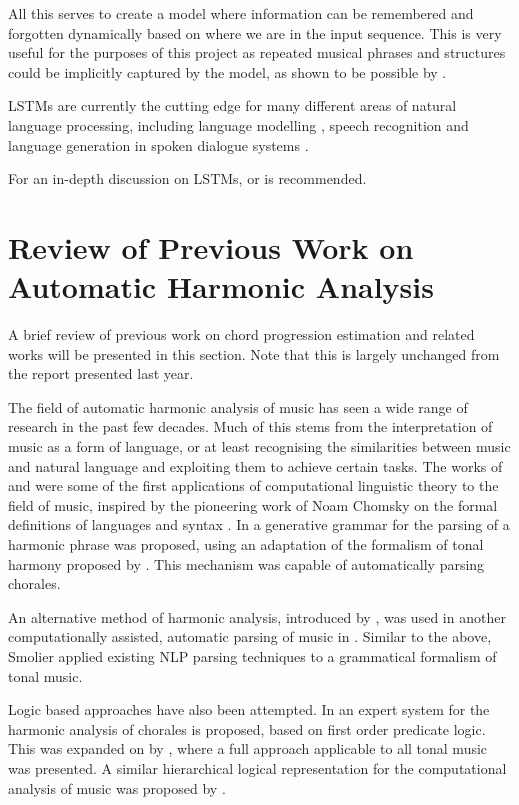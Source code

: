 \documentclass[bsc,singlespacing,logo, parskip, deptreport]{infthesis}
\begin{document}
All this serves to create a model where information can be remembered and forgotten dynamically based on where we are in the input sequence. This is very useful for the purposes of this project as repeated musical phrases and structures could be implicitly captured by the model, as shown to be possible by \cite{eck2008learning}.

LSTMs are currently the cutting edge for many different areas of natural language processing, including language modelling \cite{sundermeyer2012lstm} \cite{pichotta2016using}, speech recognition \cite{han2017ese} and language generation in spoken dialogue systems \cite{wen2016multi}.

For an in-depth discussion on LSTMs, \cite{olah_2015} or \cite{greff2016lstm} is recommended.

\section{Review of Previous Work on Automatic Harmonic Analysis}

A brief review of previous work on chord progression estimation and related works will be presented in this section. Note that this is largely unchanged from the report presented last year.

The field of automatic harmonic analysis of music has seen a wide range of research in the past few decades. Much of this stems from the interpretation of music as a form of language, or at least recognising the similarities between music and natural language and exploiting them to achieve certain tasks. The works of \cite{winograd1968linguistics} and \cite{forte1967syntax} were some of the first applications of computational linguistic theory to the field of music, inspired by the pioneering work of Noam Chomsky on the formal definitions of languages and syntax \cite{lees1957syntactic}. In \cite{winograd1968linguistics} a generative grammar for the parsing of a harmonic phrase was proposed, using an adaptation of the formalism of tonal harmony proposed by \cite{forte1962tonal}. This mechanism was capable of automatically parsing chorales.

An alternative method of harmonic analysis, introduced by \cite{schenker1979harmony}, was used in another computationally assisted, automatic parsing of music in \cite{smoliar1979computer}. Similar to the above, Smolier applied existing NLP parsing techniques to a grammatical formalism of tonal music.

Logic based approaches have also been attempted. In \cite{ebciouglu1990expert} an expert system for the harmonic analysis of chorales is proposed, based on first order predicate logic. This was expanded on by \cite{maxwell1992expert}, where a full approach applicable to all tonal music was presented. A similar hierarchical logical representation for the computational analysis of music was proposed by \cite{smaill1993hierarchical}.
\end{document}
